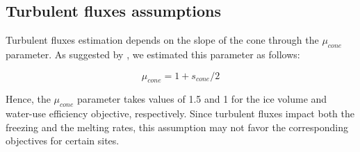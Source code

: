 \documentclass[tc, manuscript]{copernicus}
\begin{document}
\subsection{Turbulent fluxes assumptions} \label{sec:Qs}

Turbulent fluxes estimation depends on the slope of the cone through the $\mu_{cone}$ parameter. As suggested 
by \citet{oerlemansBriefCommunicationGrowth2021}, we estimated this parameter as follows:

\begin{equation}
  \mu_{cone} =1 + s_{cone}/2
\end{equation}

Hence, the $\mu_{cone}$ parameter takes values of 1.5 and 1 for the ice volume and water-use efficiency
objective, respectively.  Since turbulent fluxes impact both the freezing and the melting rates, this assumption
may not favor the corresponding objectives for certain sites.

\appendixtables   %
\end{document}
